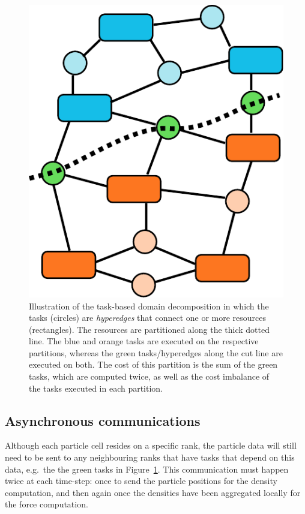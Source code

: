 \documentclass{sig-alternate-05-2015}
\begin{document}
\begin{figure}
\centering
\includegraphics[width=0.8\columnwidth]{Figures/task_graph_cut}
\caption{Illustration of the task-based domain decomposition
  in which the tasks (circles) are {\em hyperedges} that connect one or
  more resources (rectangles). The resources are partitioned
  along the thick dotted line. The blue and orange tasks are
  executed on the respective partitions, whereas the green
  tasks/hyperedges along the cut line are executed on both.
  The cost of this partition is the sum of the green tasks,
  which are computed twice, as well as the cost imbalance
  of the tasks executed in each partition.}
\label{taskgraphcut}
\end{figure}  


\subsection{Asynchronous communications}

Although each particle cell resides on a specific rank, the particle
data will still need to be sent to any neighbouring ranks that have
tasks that depend on this data, e.g.~the the green tasks in
Figure~\ref{taskgraphcut}.
This communication must happen twice at each time-step: once to send
the particle positions for the density computation, and then again
once the densities have been aggregated locally for the force
computation.
\end{document}
